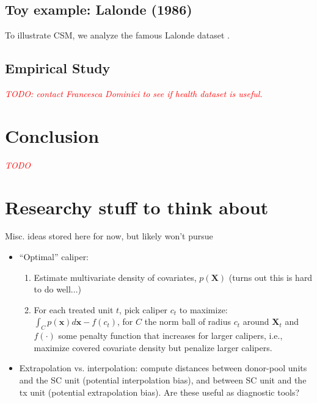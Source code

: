 \documentclass{article}
\newcommand{\bX}{\mathbf{X}}
\newcommand{\Xt}{\mathbf{X}_t}
\newcommand{\note}[1]{\textcolor{red}{\textit{#1}}}
\begin{document}



\subsection{Toy example: Lalonde (1986)}
\label{sec:lalonde}

To illustrate CSM, we analyze the famous Lalonde dataset \citep{lalonde1986evaluating}.



\subsection{Empirical Study}

\note{TODO: contact Francesca Dominici to see if health dataset is useful.}

\section{Conclusion}

\note{TODO}


\section{Researchy stuff to think about}

Misc. ideas stored here for now, but likely won't pursue
\begin{itemize}
    \item ``Optimal'' caliper:
    \begin{enumerate}
        \item Estimate multivariate density of covariates, $p(\bX)$ (turns out this is hard to do well...)
        \item For each treated unit $t$, pick caliper $c_t$ to maximize:
            $\int_{C} p(\mathbf{x})d\mathbf{x} - f(c_t)$, for $C$ the norm ball of radius $c_t$ around $\Xt$ and $f(\cdot)$ some penalty function that increases for larger calipers, i.e., maximize covered covariate density but penalize larger calipers.
    \end{enumerate}
    \item Extrapolation vs. interpolation: compute distances between donor-pool units and the SC unit (potential interpolation bias), and between SC unit and the tx unit (potential extrapolation bias). Are these useful as diagnostic tools?
\end{itemize}
\end{document}
